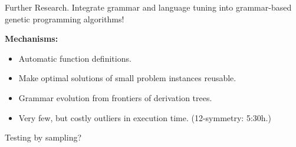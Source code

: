 \begin{frame}
\vspace*{2mm}
\begin{block}{
Further Research.
}
Integrate grammar and language tuning
into grammar-based genetic programming algorithms!
  
{\bf Mechanisms:}
\begin{itemize}
\item Automatic function definitions.
\item Make optimal solutions of small problem instances reusable.
\item Grammar evolution from frontiers of derivation trees.
\item Very few, but costly outliers in execution time. (12-symmetry: 5:30h.)
\end{itemize}
 
Testing by sampling?
\end{block}
\end{frame}